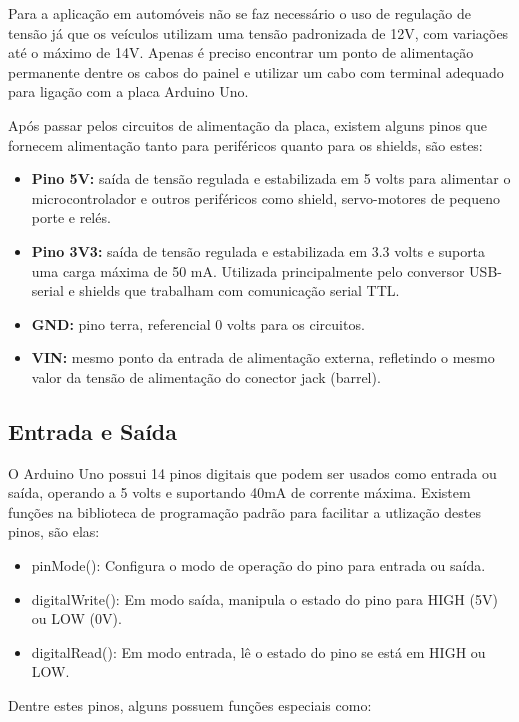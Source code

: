 Para a aplicação em automóveis não se faz necessário o uso de regulação de tensão já que os veículos utilizam uma tensão padronizada de 12V, com variações até o máximo de 14V. Apenas é preciso encontrar um ponto de alimentação permanente dentre os cabos do painel e utilizar um cabo com terminal adequado para ligação com a placa Arduino Uno.

Após passar pelos circuitos de alimentação da placa, existem alguns pinos que fornecem alimentação tanto para periféricos quanto para os shields, são estes:

\begin{itemize}
	\item \textbf{Pino 5V:} saída de tensão regulada e estabilizada em 5 volts para alimentar o microcontrolador e outros periféricos como shield, servo-motores de pequeno porte e relés.
	\item \textbf{Pino 3V3:} saída de tensão regulada e estabilizada em 3.3 volts e suporta uma carga máxima de 50 mA. Utilizada principalmente pelo conversor USB-serial e shields que trabalham com comunicação serial TTL.
	\item \textbf{GND:} pino terra, referencial 0 volts para os circuitos.
	\item \textbf{VIN:} mesmo ponto da entrada de alimentação externa, refletindo o mesmo valor da tensão de alimentação do conector jack (barrel).
\end{itemize}

\subsection{Entrada e Saída}

O Arduino Uno possui 14 pinos digitais que podem ser usados como entrada ou saída, operando a 5 volts e suportando 40mA de corrente máxima. Existem funções na biblioteca de programação padrão para facilitar a utlização destes pinos, são elas:

\begin{itemize}
	\item pinMode(): Configura o modo de operação do pino para entrada ou saída.
	\item digitalWrite(): Em modo saída, manipula o estado do pino para HIGH (5V) ou LOW (0V).
	\item digitalRead(): Em modo entrada, lê o estado do pino se está em HIGH ou LOW.
\end{itemize}

Dentre estes pinos, alguns possuem funções especiais como:

